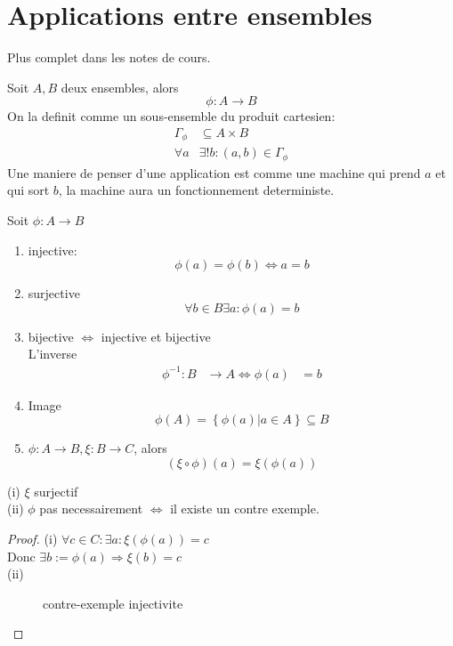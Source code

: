 \documentclass[../main.tex]{subfiles}
\begin{document}
\section{Applications entre ensembles}
Plus complet dans les notes de cours.\\
\begin{defn}\label{defn:formalisation_des_applications}
	Soit $A, B$ deux ensembles, alors 
	\[ 
	\phi : A \to B
	\]
	On la definit comme un sous-ensemble du produit cartesien:
	\begin{align*}
		\Gamma_\phi &\subseteq A \times B\\
		\forall a &\exists ! b: ( a,b) \in \Gamma_\phi
	\end{align*}
	Une maniere de penser d'une application est comme une machine qui prend $a$ et qui sort $b$, la machine aura un fonctionnement deterministe.
\end{defn}
\begin{propr}\label{propr:propriete_des_applications}
	Soit $\phi: A \to B$
	\begin{enumerate}
		\item injective:
			\[ 
				\phi(a) = \phi(b) \iff a=b
			\]
		\item surjective
			\[ 
				\forall b \in B \exists a : \phi(a)=b
			\]
		\item bijective $\iff$ injective et bijective\\
			L'inverse
			\begin{align*}
				\phi^{-1}: B &\to A
				\iff \phi(a) &= b
			\end{align*}
			
		\item Image
			\[ 
				\phi(A) = \left\{ \phi(a) \vert a \in A \right\} \subseteq B
			\]
		\item $\phi: A \to B, \xi :B \to C$, alors
			\[ 
				( \xi \circ \phi )(a) = \xi(\phi(a))
			\]
	\end{enumerate}
\end{propr}
\begin{propo}\label{propo:surjectivite_de_la_composition}
	(i) $\xi$ surjectif\\
	(ii) $\phi$ pas necessairement $\iff$ il existe un contre exemple.
\end{propo}
\begin{proof}
	(i) $\forall c \in C: \exists a: \xi(\phi(a))=c$\\
	Donc $\exists b :=\phi(a) \Rightarrow \xi(b)=c$\\
	(ii) 
\begin{figure}[ht]
    \centering
    \caption{contre-exemple injectivite}
    \label{fig:contre-exemple-injectivite}
\end{figure}
\end{proof}
\end{document}
